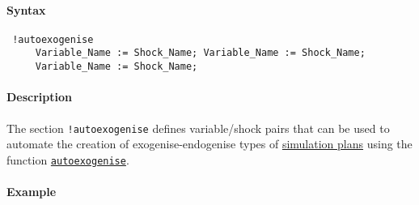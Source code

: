


	\paragraph{Syntax}
 
 \begin{verbatim}
 !autoexogenise
     Variable_Name := Shock_Name; Variable_Name := Shock_Name;
     Variable_Name := Shock_Name;
 \end{verbatim}
 
 \paragraph{Description}
 
 The section \texttt{!autoexogenise} defines variable/shock pairs that
 can be used to automate the creation of exogenise-endogenise types of
 \href{plan/Contents}{simulation plans} using the function
 \href{plan/autoexogenise}{\texttt{autoexogenise}}.
 
 \paragraph{Example}


